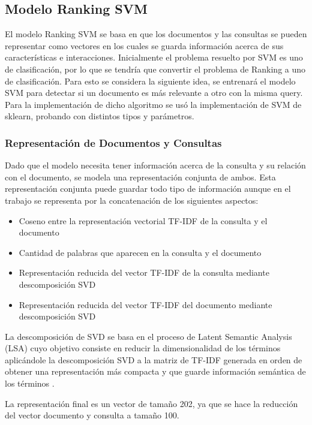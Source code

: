 \documentclass[runningheads]{llncs}
\begin{document}
\subsection{Modelo Ranking SVM}

El modelo Ranking SVM se basa en que los documentos y las consultas se pueden representar como vectores
en los cuales se guarda información acerca de sus características e interacciones. Inicialmente
el problema resuelto por SVM es uno de clasificación, por lo que se tendría que convertir
el problema de Ranking a uno de clasificación. Para esto se considera la siguiente idea, se
entrenará el modelo SVM para detectar si un documento es más relevante a otro con la misma query.
Para la implementación de dicho algoritmo se usó la implementación de SVM de sklearn, probando con
distintos tipos y parámetros.

\subsubsection{Representación de Documentos y Consultas}

Dado que el modelo necesita tener información acerca de la consulta y su relación con el documento,
se modela una representación conjunta de ambos. Esta representación conjunta puede guardar todo tipo
de información aunque en el trabajo se representa por la concatenación de los siguientes aspectos:

\begin{itemize}
	\item Coseno entre la representación vectorial TF-IDF de la consulta y el documento
	\item Cantidad de palabras que aparecen en la consulta y el documento
	\item Representación reducida del vector TF-IDF de la consulta mediante descomposición SVD
	\item Representación reducida del vector TF-IDF del documento mediante descomposición SVD
\end{itemize}

La descomposición de SVD se basa en el proceso de Latent Semantic Analysis (LSA) cuyo objetivo 
consiste en reducir la dimensionalidad de los términos aplicándole la descomposición SVD a la
matriz de TF-IDF generada en orden de obtener una representación más compacta y que guarde 
información semántica de los términos \cite{lsaWiki}.

La representación final es un vector de tamaño 202, ya que se hace la reducción del vector documento y consulta
a tamaño 100.
\end{document}
